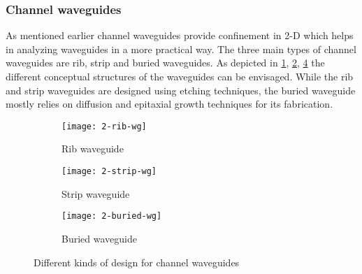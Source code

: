 \documentclass[../report.tex]{subfiles}
\begin{document}
		\subsubsection{Channel waveguides}			
As mentioned earlier channel waveguides provide confinement in 2-D which helps in analyzing waveguides in a more practical way. The three main types of channel waveguides are rib, strip and buried waveguides. As depicted in \ref{fig:2_rib_wg}, \ref{fig:2_strip_wg}, \ref{fig:2_buried_wg} the different conceptual structures of the waveguides can be envisaged. While the rib and strip waveguides are designed using etching techniques, the buried waveguide mostly relies on diffusion and epitaxial growth techniques for its fabrication.
\begin{figure}[H] %
	\begin{subfigure}[t]{0.3\textwidth}
		\texttt{[image: 2-rib-wg]}
		\caption{Rib waveguide}
		\label{fig:2_rib_wg}
	\end{subfigure}
	\hfill
	\begin{subfigure}[t]{0.3\textwidth}
		\texttt{[image: 2-strip-wg]}
		\caption{Strip waveguide}
		\label{fig:2_strip_wg}
	\end{subfigure}
	\hfill
	\begin{subfigure}[t]{0.3\textwidth}
		\texttt{[image: 2-buried-wg]}
		\caption{Buried waveguide}
		\label{fig:2_buried_wg}
	\end{subfigure}
	\caption{Different kinds of design for channel waveguides}
\end{figure}
\end{document}
